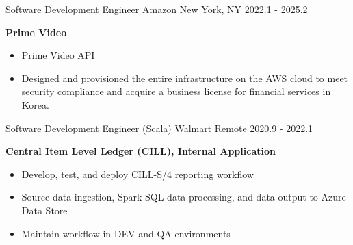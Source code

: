 

\begin{cventries}

  \cventry
    {Software Development Engineer} %
    {Amazon} %
    {New York, NY} %
    {2022.1 - 2025.2} %
    {
      \textbf{Prime Video}
      \vspace{1mm}
      \begin{itemize}\itemsep2pt %
          \item {Prime Video API}
          \item {Designed and provisioned the entire infrastructure on the AWS cloud to meet security compliance and acquire a business license for financial services in Korea.}
      \end{itemize}
    }
    \cventry
      {Software Development Engineer (Scala)} %
      {Walmart} %
      {Remote} %
      {2020.9 - 2022.1} %
      { 
        \textbf{Central Item Level Ledger (CILL), Internal Application}
        \vspace{1mm}
        \begin{itemize}\itemsep2pt
          \item Develop, test, and deploy CILL-S/4 reporting workflow
          \item Source data ingestion, Spark SQL data processing, and data output to Azure Data Store
          \item Maintain workflow in DEV and QA environments
        \end{itemize}
        \vspace{1mm}
      }


\end{cventries}
